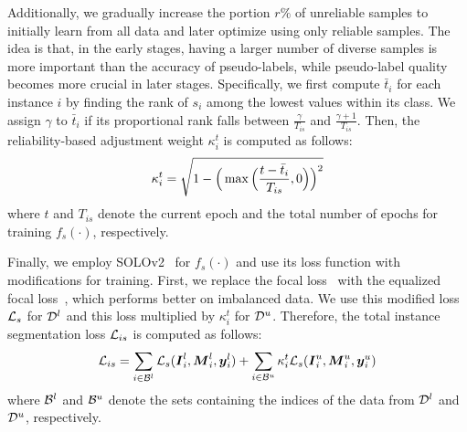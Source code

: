 Additionally, we gradually increase the portion $r\%$ of unreliable samples to initially learn from all data and later optimize using only reliable samples. The idea is that, in the early stages, having a larger number of diverse samples is more important than the accuracy of pseudo-labels, while pseudo-label quality becomes more crucial in later stages. Specifically, we first compute $\bar{t}_i$ for each instance $i$ by finding the rank of $s_i$ among the lowest values within its class. We assign $\gamma$ to $\bar{t}_i$ if its proportional rank falls between $\frac{\gamma}{T_{is}}$ and $\frac{\gamma+1}{T_{is}}$. Then, the reliability-based adjustment weight $\kappa^t_i$ is computed as follows:
\begin{equation}
\kappa^t_i = \sqrt{1-\Big( \max \Big(\frac{ t - \bar{t}_i}{T_{is}}, 0 \Big) \Big)^2} \\
\label{eqn:adjusting_weight}
\end{equation}
where $t$ and $T_{is}$ denote the current epoch and the total number of epochs for training $f_s(\cdot)$, respectively.



% 

Finally, we employ SOLOv2~\cite{wang2020solov2} for $f_s(\cdot)$ and use its loss function with modifications for training. First, we replace the focal loss~\cite{lin2017focal} with the equalized focal loss~\cite{li2022equalized}, which performs better on imbalanced data. We use this modified loss $\mathcal{L}_{s}$ for $\mathcal{D}^l$ and this loss multiplied by $\kappa^t_i$ for $\mathcal{D}^u$. Therefore, the total instance segmentation loss $\mathcal{L}_{is}$ is computed as follows:
\begin{equation}
\begin{split}
\mathcal{L}_{is} = \sum_{i \in \mathcal{B}^l} \mathcal{L}_{s}(\boldsymbol{I}^l_i,\boldsymbol{M}^l_i,\boldsymbol{y}^l_i) + \sum_{i \in \mathcal{B}^u} \kappa^t_i \mathcal{L}_{s}(\boldsymbol{I}^u_i,\boldsymbol{M}^u_i,\boldsymbol{y}^u_i)
\label{eqn:loss_instance_segmentation}
\end{split}
\end{equation}
where $\mathcal{B}^l$ and $\mathcal{B}^u$ denote the sets containing the indices of the data from $\mathcal{D}^l$ and $\mathcal{D}^u$, respectively.




% 



